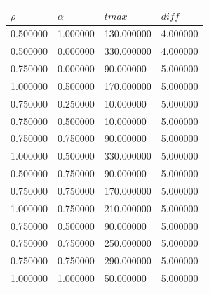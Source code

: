 \documentclass[12pt]{report}
\begin{document}
\begin{center}
	
	\begin{table}[h!]
		\begin{center}
			\begin{tabular}{|llll|}
				\hline
				\multicolumn{1}{|l|}{$\rho$}      & \multicolumn{1}{l|}{$\alpha$} & \multicolumn{1}{l|}{$tmax$} & $diff$      \\ \hline
				\multicolumn{1}{|c}{0.500000} & 1.000000                   & 130.000000                & 4.000000 \\
				0.500000                      & 0.000000                   & 330.000000                & 4.000000 \\
				0.750000                      & 0.000000                   & 90.000000                 & 5.000000 \\
				1.000000                      & 0.500000                   & 170.000000                & 5.000000 \\
				0.750000                      & 0.250000                   & 10.000000                 & 5.000000 \\
				0.750000                      & 0.500000                   & 10.000000                 & 5.000000 \\
				0.750000                      & 0.750000                   & 90.000000                 & 5.000000 \\
				1.000000                      & 0.500000                   & 330.000000                & 5.000000 \\
				0.500000                      & 0.750000                   & 90.000000                 & 5.000000 \\
				0.750000                      & 0.750000                   & 170.000000                & 5.000000 \\
				1.000000                      & 0.750000                   & 210.000000                & 5.000000 \\
				0.750000                      & 0.500000                   & 90.000000                 & 5.000000 \\
				0.750000                      & 0.750000                   & 250.000000                & 5.000000 \\
				0.750000                      & 0.750000                   & 290.000000                & 5.000000 \\
				1.000000                      & 1.000000                   & 50.000000                 & 5.000000 \\

\end{tabular}
\end{center}
\end{table}
\end{center}
\end{document}
